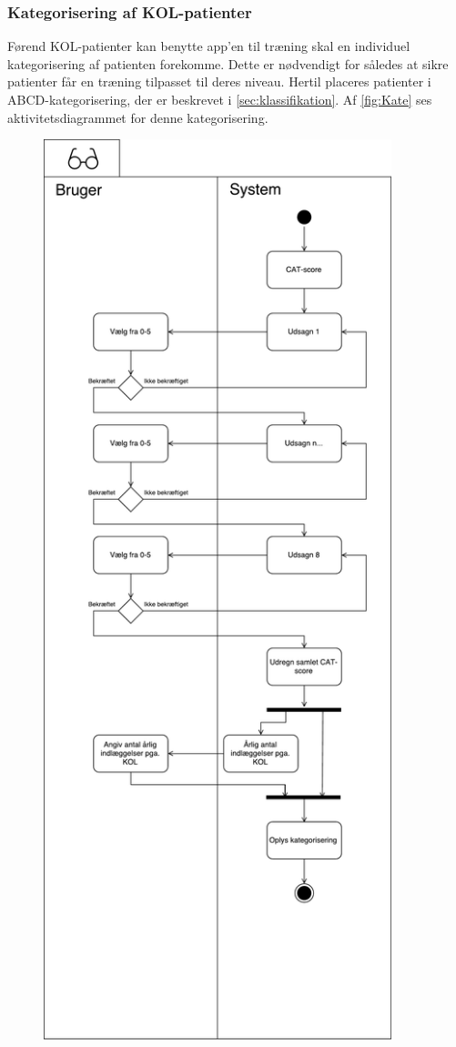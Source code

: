 \subsubsection{Kategorisering af KOL-patienter}
Førend KOL-patienter kan benytte app'en til træning skal en individuel kategorisering af patienten forekomme. Dette er nødvendigt for således at sikre patienter får en træning tilpasset til deres niveau. 
Hertil placeres patienter i ABCD-kategorisering, der er beskrevet i \autoref{sec:klassifikation}. Af \autoref{fig:Kate} ses aktivitetsdiagrammet for denne kategorisering.

\begin{figure} [H]
\centering
\includegraphics[width=0.9\textwidth]{figures/aktivitetsdiagram/Kategorisering}

\end{figure}
